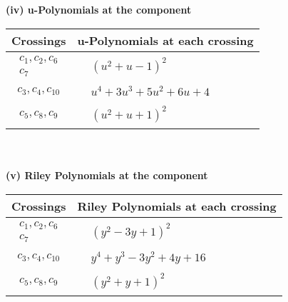 \documentclass[1p]{elsarticle_modified}
\theoremstyle{definition}
\begin{document}
\newpage\renewcommand{\arraystretch}{1}
\flushleft \textbf{(iv) u-Polynomials at the component}\newline \\
\begin{tabular}{m{50pt}|m{274pt}}
Crossings & \hspace{64pt}u-Polynomials at each crossing \\
\hline $$\begin{aligned}c_{1},c_{2},c_{6}\\c_{7}\end{aligned}$$&$\begin{aligned}
&(u^2+u-1)^2
\end{aligned}$\\
\hline $$\begin{aligned}c_{3},c_{4},c_{10}\end{aligned}$$&$\begin{aligned}
&u^4+3 u^3+5 u^2+6 u+4
\end{aligned}$\\
\hline $$\begin{aligned}c_{5},c_{8},c_{9}\end{aligned}$$&$\begin{aligned}
&(u^2+u+1)^2
\end{aligned}$\\
\hline
\end{tabular}\\~\\
\newpage\renewcommand{\arraystretch}{1}
\flushleft \textbf{(v) Riley Polynomials at the component}\newline \\
\begin{tabular}{m{50pt}|m{274pt}}
Crossings & \hspace{64pt}Riley Polynomials at each crossing \\
\hline $$\begin{aligned}c_{1},c_{2},c_{6}\\c_{7}\end{aligned}$$&$\begin{aligned}
&(y^2-3 y+1)^2
\end{aligned}$\\
\hline $$\begin{aligned}c_{3},c_{4},c_{10}\end{aligned}$$&$\begin{aligned}
&y^4+y^3-3 y^2+4 y+16
\end{aligned}$\\
\hline $$\begin{aligned}c_{5},c_{8},c_{9}\end{aligned}$$&$\begin{aligned}
&(y^2+y+1)^2
\end{aligned}$\\
\hline
\end{tabular}\\~\\
\end{document}
